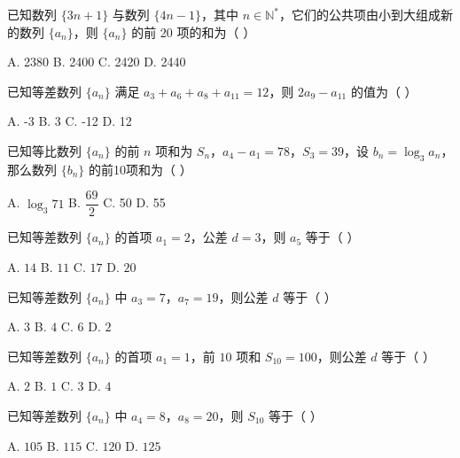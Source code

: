 \documentclass[11pt, a4paper]{article}
\begin{document}
\begin{baitap}[6]
已知数列 $\{3n + 1\}$ 与数列 $\{4n - 1\}$，其中 $n \in \mathbb{N}^{*}$，它们的公共项由小到大组成新的数列 $\{a_n\}$，则 $\{a_n\}$ 的前 20 项的和为（ ）
\par\vspace{3pt}
\noindent A. 2380 \quad B. 2400 \quad C. 2420 \quad D. 2440
\end{baitap}

\begin{baitap}[7]
已知等差数列 $\{a_n\}$ 满足 $a_3 + a_6 + a_8 + a_{11} = 12$，则 $2a_9 - a_{11}$ 的值为（ ）
\par\vspace{3pt}
\noindent A. -3 \quad B. 3 \quad C. -12 \quad D. 12
\end{baitap}

\begin{baitap}[8]
已知等比数列 $\{a_n\}$ 的前 $n$ 项和为 $S_n$，$a_4 - a_1 = 78$，$S_3 = 39$，设 $b_n = \log_3 a_n$，那么数列 $\{b_n\}$ 的前10项和为（ ）
\par\vspace{3pt}
\noindent A. $\log_3 71$ \quad B. $\dfrac{69}{2}$ \quad C. 50 \quad D. 55
\end{baitap}

\begin{baitap}[9]
已知等差数列 $\{a_n\}$ 的首项 $a_1 = 2$，公差 $d = 3$，则 $a_5$ 等于（ ）
\par\vspace{3pt}
\noindent A. $14$ \quad B. $11$ \quad C. $17$ \quad D. $20$
\end{baitap}

\begin{baitap}[10]
已知等差数列 $\{a_n\}$ 中 $a_3 = 7$，$a_7 = 19$，则公差 $d$ 等于（ ）
\par\vspace{3pt}
\noindent A. $3$ \quad B. $4$ \quad C. $6$ \quad D. $2$
\end{baitap}

\begin{baitap}[11]
已知等差数列 $\{a_n\}$ 的首项 $a_1 = 1$，前 $10$ 项和 $S_{10} = 100$，则公差 $d$ 等于（ ）
\par\vspace{3pt}
\noindent A. $2$ \quad B. $1$ \quad C. $3$ \quad D. $4$
\end{baitap}

\begin{baitap}[12]
已知等差数列 $\{a_n\}$ 中 $a_4 = 8$，$a_8 = 20$，则 $S_{10}$ 等于（ ）
\par\vspace{3pt}
\noindent A. $105$ \quad B. $115$ \quad C. $120$ \quad D. $125$
\end{baitap}
\end{document}
